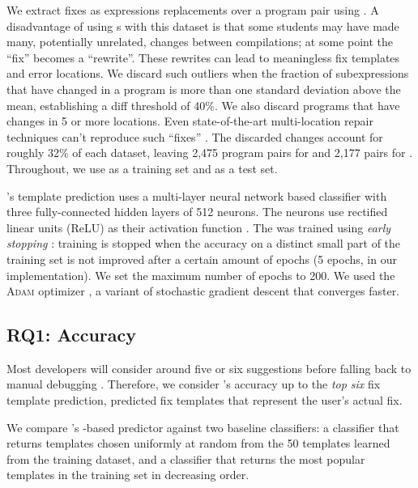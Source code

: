 %
We extract fixes as expressions replacements over a program pair using \diffsym.
A disadvantage of using \diffsym s with this dataset is that some students may
have made many, potentially unrelated, changes between compilations; at some
point the ``fix'' becomes a ``rewrite''. These rewrites can lead to meaningless
fix templates and error locations. We discard such outliers when the fraction of
subexpressions that have changed in a program is more than one standard
deviation above the mean, establishing a diff threshold of 40\%. We also discard
programs that have changes in 5 or more locations. Even state-of-the-art
multi-location repair techniques can't reproduce such ``fixes''
\citep{Saha_2019}. The discarded changes account for roughly 32\% of each
dataset, leaving 2,475 program pairs for \SPRING and 2,177 pairs for \FALL.
Throughout, we use \SPRING as a training set and \FALL as a test set.

%
\toolname's template prediction uses a multi-layer neural network \dnn based
classifier with three fully-connected hidden layers of 512 neurons. The neurons
use rectified linear units (ReLU) as their activation function
\citep{Nair2010-xg}.
%
The \dnn was trained using \emph{early stopping} \citep{Hastie2009-bn}: training
is stopped when the accuracy on a distinct small part of the training set is not
improved after a certain amount of epochs (5 epochs, in our implementation).
%
We set the maximum number of epochs to 200.
%
We used the \textsc{Adam} optimizer \citep{Kingma2014-ng},
a variant of stochastic gradient descent that converges faster.

\subsection{RQ1: Accuracy}

\label{sec:eval:accuracy}

Most developers will consider around five or six suggestions before falling back
to manual debugging \citep{Kochhar2016-oc}.
%
Therefore, we consider \toolname's accuracy up to the \emph{top six} fix
template prediction, \ie predicted fix templates that represent the user's
actual fix.

%
We compare \toolname's \dnn-based predictor against two baseline classifiers: a
\random classifier that returns templates chosen uniformly at random from the 50
templates learned from the \SPRING training dataset, and a \popular classifier
that returns the most popular templates in the training set in decreasing order.


